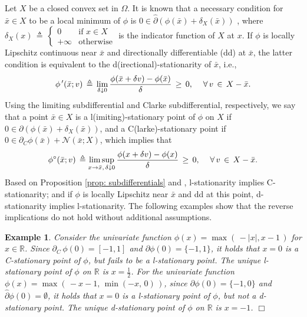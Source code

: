 \documentclass{siamart}
\newcommand{\epc}{\hspace{1pc}}
\newcommand{\wh}{\widehat}
\newtheorem{example}{Example}
\begin{document}
Let $X$ be a closed convex set in $\Omega$. It is known that a necessary condition for $\bar{x}\in X$ to be a local minimum of $\phi$ is $0\in \wh{\partial}\left(\phi(\bar{x}) + \delta_X(\bar{x})\right)$ \cite[Theorem 10.1]{RockafellarRWets98}, where $\delta_X(x) \,\triangleq\, \left\{
\begin{array}{ll} 0 & \mbox{if $x\in X$} \\
+\infty & \mbox{otherwise}
\end{array}
\right.$ is the indicator function of $X$ at $x$.
If $\phi$ is  locally Lipschitz continuous near $\bar{x}$ and directionally differentiable (dd) at $\bar{x}$, the latter condition is equivalent to the d(irectional)-stationarity of $\bar{x}$, i.e.,
$$
\phi^{\, \prime}(\bar{x};v) \, \triangleq \, \displaystyle{
\lim_{\delta\downarrow 0}
} \, \displaystyle{
\frac{\phi(\bar{x} + \delta v) - \phi(\bar{x})}{\delta}
}  \,\geq\, 0, \epc \forall \, v \, \in \, X - \bar{x}.
$$
Using the limiting subdifferential and Clarke subdifferential, respectively, we say that a point $\bar{x}\in X$ is a
l(imiting)-stationary point of $\phi$ on $X$ if
$0\in {\partial}\left(\phi(\bar{x}) + \delta_X(\bar{x})\right)$, and a
C(larke)-stationary point if $0\in 
{\partial}_C \phi(\bar{x})  + \mathcal{N}(\bar{x};X)$, which implies that
\[\phi^{\circ}(\bar{x};v) \, \triangleq \displaystyle{
\limsup_{x \to \bar{x},\,\delta \downarrow 0}
} \, \displaystyle{
\frac{\phi(x + \delta v)- \phi(x)}{\delta}
} \, \geq \, 0, \epc \forall \, v \, \in \, X - \bar{x}.
\]
Based on Proposition \ref{prop: subdifferentials} and \cite[Exercise 10.10]{RockafellarRWets98}, l-stationarity implies C-stationarity; and if $\phi$ is locally Lipschitz near $\bar{x}$ and dd at this point, d-stationarity implies l-stationarity.
The following examples show that the reverse implications do not hold without additional assumptions.


\begin{example}
Consider the univariate function $\phi(x) =\max( \,-|x|, x-1\,)$ for $x\in \mathbb{R}$.  Since $\partial_C \,\phi(0) = [-1,1]$ and
$\partial \phi(0) = \{-1,1\}$, it holds that $x=0$ is a C-stationary point of $\phi$, but fails to be a l-stationary point.
The unique l-stationary point of $\phi$ on $\mathbb{R}$ is  $x = \frac{1}{2}$.
For the univariate function $\phi(x) = \max\left(\,-x-1,\,\min(-x,\,0)\,\right)$,
since $\partial \phi(0) = \{-1,0\}$ and $\wh{\partial} \phi(0) = \emptyset$, it holds that $x=0$ is a l-stationary point of $\phi$,
but not a d-stationary point.  The unique d-stationary point of $\phi$ on $\mathbb{R}$ is  $x = -1$. \hfill $\Box$
\end{example}
\end{document}
